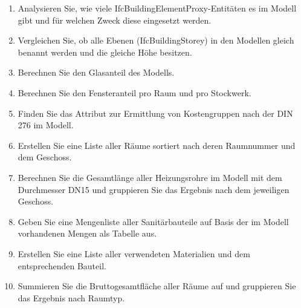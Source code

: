 \begin{enumerate}
    \item Analysieren Sie, wie viele IfcBuildingElementProxy-Entitäten es im Modell gibt und für welchen Zweck diese eingesetzt werden.
    \item Vergleichen Sie, ob alle Ebenen (IfcBuildingStorey) in den Modellen gleich benannt werden und die gleiche Höhe besitzen.
    \item Berechnen Sie den Glasanteil des Modells.
    \item Berechnen Sie den Fensteranteil pro Raum und pro Stockwerk.
    \item Finden Sie das Attribut zur Ermittlung von Kostengruppen nach der DIN 276 im Modell.
    \item Erstellen Sie eine Liste aller Räume sortiert nach deren Raumnummer und dem Geschoss.
    \item Berechnen Sie die Gesamtlänge aller Heizungsrohre im Modell mit dem Durchmesser DN15 und gruppieren Sie das Ergebnis nach dem jeweiligen Geschoss. 
    \item Geben Sie eine Mengenliste aller Sanitärbauteile auf Basis der im Modell vorhandenen Mengen als Tabelle aus.
    \item Erstellen Sie eine Liste aller verwendeten Materialien und dem entsprechenden Bauteil.
    \item Summieren Sie die Bruttogesamtfläche aller Räume auf und gruppieren Sie das Ergebnis nach Raumtyp.
\end{enumerate}